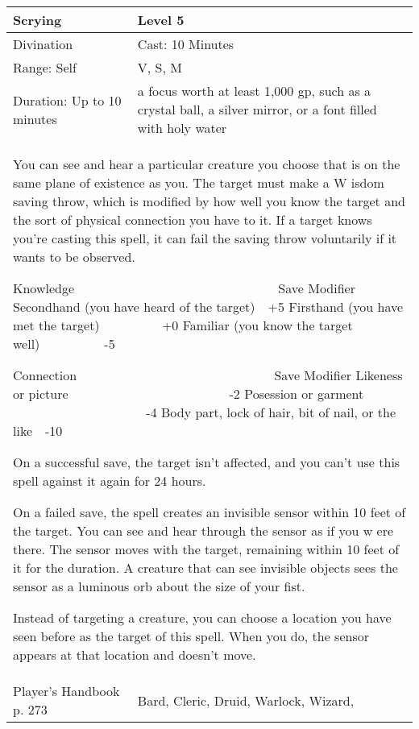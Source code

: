 \documentclass[11pt]{report}
\begin{document}
\begin{table}[H]
	\begin{tabular}{||p{6cm}|p{6cm}||}
		\hline\hline
		\bf{Scrying} & Level 5\\ \hline
		Divination & Cast: 10 Minutes\\ \hline
		Range: Self & V, S, M\\ \hline
		Duration: Up to 10 minutes & a focus worth at least 1,000 gp, such as a crystal ball, a silver mirror, or a font filled with holy water\\ \hline
		\multicolumn{2}{||p{12cm}||}{You can see and hear a particular creature you choose that is on the same plane of existence as you. The target must make a W isdom saving throw, which is modified by how well you know the target and the sort of physical connection you have to it. If a target knows you’re casting this spell, it can fail the saving throw voluntarily if it wants to be observed.

Knowledge                 Save Modifier
Secondhand (you have heard of the target) +5
Firsthand (you have met the target)      +0
Familiar (you know the target well)     -5

Connection                Save Modifier
Likeness or picture               -2
Posession or garment            -4
Body part, lock of hair, bit of nail, or the like -10

On a successful save, the target isn’t affected, and you can’t use this spell against it again for 24 hours.

On a failed save, the spell creates an invisible sensor within 10 feet of the target. You can see and hear through the sensor as if you w ere there. The sensor moves with the target, remaining within 10 feet of it for the duration. A creature that can see invisible objects sees the sensor as a luminous orb about the size of your fist.

Instead of targeting a creature, you can choose a location you have seen before as the target of this spell. When you do, the sensor appears at that location and doesn’t move.}\\ \hline
Player's Handbook p. 273 & Bard, Cleric, Druid, Warlock, Wizard, \\ \hline\hline
	\end{tabular}
\end{table}
\end{document}
